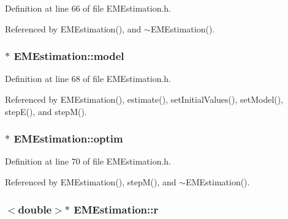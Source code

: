 Definition at line 66 of file E\+M\+Estimation.\+h.



Referenced by E\+M\+Estimation(), and $\sim$\+E\+M\+Estimation().

\hypertarget{classEMEstimation_ad7a5d7459c7c0632a1aa3917fd7f3ba0}{}
\subsubsection[{model}]{$\ast$ E\+M\+Estimation\+::model\hspace{0.3cm}{\ttfamily [private]}}\label{classEMEstimation_ad7a5d7459c7c0632a1aa3917fd7f3ba0}


Definition at line 68 of file E\+M\+Estimation.\+h.



Referenced by E\+M\+Estimation(), estimate(), set\+Initial\+Values(), set\+Model(), step\+E(), and step\+M().

\hypertarget{classEMEstimation_abbabf603bb09b6338114dd53aef5bd8a}{}
\subsubsection[{optim}]{$\ast$ E\+M\+Estimation\+::optim\hspace{0.3cm}{\ttfamily [private]}}\label{classEMEstimation_abbabf603bb09b6338114dd53aef5bd8a}


Definition at line 70 of file E\+M\+Estimation.\+h.



Referenced by E\+M\+Estimation(), step\+M(), and $\sim$\+E\+M\+Estimation().

\hypertarget{classEMEstimation_a426db380391c487206521631156d7eb6}{}
\subsubsection[{r}]{$<$double$>$$\ast$ E\+M\+Estimation\+::r\hspace{0.3cm}{\ttfamily [private]}}\label{classEMEstimation_a426db380391c487206521631156d7eb6}


